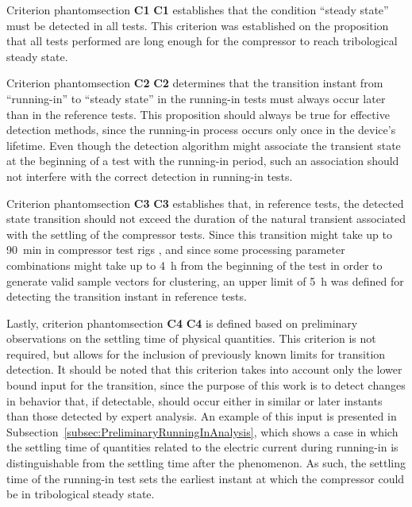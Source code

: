 \documentclass[preprint,11pt,number]{elsarticle}
\makeatletter
\newcommand{\labeltext}[3][]{%
    \@bsphack%
    \csname phantomsection\endcsname%
    \def\tst{#1}%
    \def\labelmarkup{}%
    \def\refmarkup{}%
    \ifx\tst\empty\def\@currentlabel{\refmarkup{#2}}{\label{#3}}%
    \else\def\@currentlabel{\refmarkup{#1}}{\label{#3}}\fi%
    \@esphack%
    \labelmarkup{#2}%
}
\makeatother
\begin{document}
Criterion \labeltext[\textbf{C1}]{\textbf{C1}}{crit:todosAmac} establishes that the condition ``steady state'' must be detected in all tests. This criterion was established on the proposition that all tests performed are long enough for the compressor to reach tribological steady state.

Criterion \labeltext[\textbf{C2}]{\textbf{C2}}{crit:NAmacMaior} determines that the transition instant from ``running-in'' to ``steady state'' in the running-in tests must always occur later than in the reference tests. This proposition should always be true for effective detection methods, since the running-in process occurs only once in the device's lifetime. Even though the detection algorithm might associate the transient state at the beginning of a test with the running-in period, such an association should not interfere with the correct detection in running-in tests.

Criterion \labeltext[\textbf{C3}]{\textbf{C3}}{crit:menor5} establishes that, in reference tests, the detected state transition should not exceed the duration of the natural transient associated with the settling of the compressor tests. Since this transition might take up to \SI{90}{\minute} in compressor test rigs \cite{Penz2012}, and since some processing parameter combinations might take up to \SI{4}{\hour} from the beginning of the test in order to generate valid sample vectors for clustering, an upper limit of \SI{5}{\hour} was defined for detecting the transition instant in reference tests.

Lastly, criterion \labeltext[\textbf{C4}]{\textbf{C4}}{crit:maior10} is  defined based on preliminary observations on the settling time of physical quantities. This criterion is not required, but allows for the inclusion of previously known limits for transition detection. It should be noted that this criterion takes into account only the lower bound input for the transition, since the purpose of this work is to detect changes in behavior that, if detectable, should occur either in similar or later instants than those detected by expert analysis. An example of this input is presented in Subsection~\ref{subsec:PreliminaryRunningInAnalysis}, which shows a case in which the settling time of quantities related to the electric current during running-in is distinguishable from the settling time after the phenomenon. As such, the settling time of the running-in test sets the earliest instant at which the compressor could be in tribological steady state.
\end{document}
